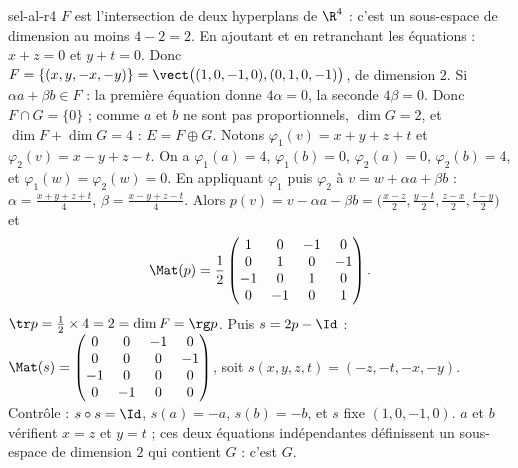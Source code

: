 \begin{corrige}{sel-al-r4}
 $F$ est l'intersection de deux hyperplans de $\R^4$ : c'est un sous-espace de dimension au moins $4-2=2$. En ajoutant et en
retranchant les équations : $x+z=0$ et $y+t=0$. Donc $F=\{(x,y,-x,-y)\}=\vect\big((1,0,-1,0),(0,1,0,-1)\big)$, de dimension $2$.
 Si $\alpha a+\beta b\in F$ : la première équation donne $4\alpha=0$, la seconde $4\beta=0$. Donc $F\cap G=\{0\}$ ; comme
$a$ et $b$ ne sont pas proportionnels, $\dim G=2$, et $\dim F+\dim G=4$ : $E=F\oplus G$.
 Notons $\varphi_1(v)=x+y+z+t$ et $\varphi_2(v)=x-y+z-t$. On a $\varphi_1(a)=4$, $\varphi_1(b)=0$, $\varphi_2(a)=0$,
$\varphi_2(b)=4$, et $\varphi_1(w)=\varphi_2(w)=0$. En appliquant $\varphi_1$ puis $\varphi_2$ à $v=w+\alpha a+\beta b$ :
$\alpha=\frac{x+y+z+t}4$, $\beta=\frac{x-y+z-t}4$. Alors $p(v)=v-\alpha a-\beta b=\big(\frac{x-z}2,\frac{y-t}2,\frac{z-x}2,\frac{t-y}2\big)$ et
\[\Mat(p)=\frac12\begin{pmatrix}1&0&-1&0\\0&1&0&-1\\-1&0&1&0\\0&-1&0&1\end{pmatrix}.\]
 $\tr p=\frac12\times4=2=\dim F=\rg p$. Puis $s=2p-\Id$ : $\Mat(s)=\begin{pmatrix}0&0&-1&0\\0&0&0&-1\\-1&0&0&0\\0&-1&0&0\end{pmatrix}$,
soit $s(x,y,z,t)=(-z,-t,-x,-y)$. Contrôle : $s\circ s=\Id$, $s(a)=-a$, $s(b)=-b$, et $s$ fixe $(1,0,-1,0)$.
 $a$ et $b$ vérifient $x=z$ et $y=t$ ; ces deux équations indépendantes définissent un sous-espace de dimension $2$ qui contient
$G$ : c'est $G$.
\end{corrige}

